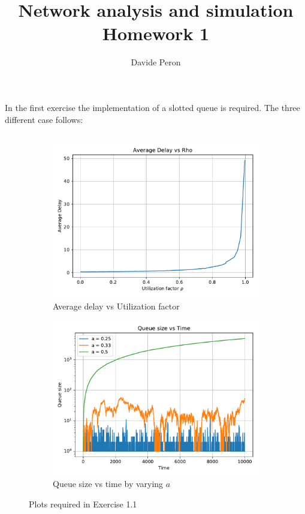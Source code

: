 \documentclass[11pt,a4paper]{article}
\title{\blue Network analysis and simulation\\ Homework 1}
\author{Davide Peron}
\date{}
\begin{document}
\maketitle
\section{}
In the first exercise the implementation of a slotted queue is required.
The three different case follows:
\subsection{}
\label{ex:1.1}

\begin{figure}[ht]
\centering
\begin{subfigure}{.5\textwidth}
  \centering
  \includegraphics[width=\linewidth]{avg_delay_vs_rho_1}
  \caption{Average delay vs Utilization factor}
  \label{fig:delayRho1}
\end{subfigure}%
\begin{subfigure}{.5\textwidth}
  \centering
  \includegraphics[width=\linewidth]{queue_size_vs_time_logy}
  \caption{Queue size vs time by varying $a$}
  \label{fig:queueSize1}
\end{subfigure}
\caption{Plots required in Exercise 1.1}
\end{figure}
\end{document}

